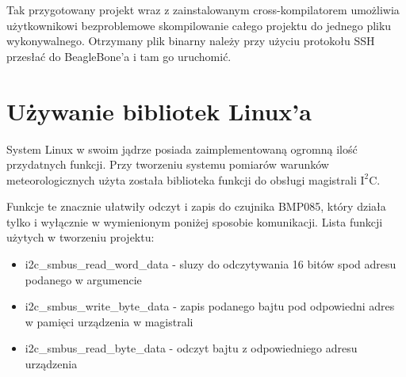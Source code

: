 Tak przygotowany projekt wraz z zainstalowanym cross-kompilatorem umożliwia użytkownikowi bezproblemowe skompilowanie całego projektu do jednego pliku wykonywalnego. Otrzymany plik binarny należy przy użyciu protokołu SSH przesłać do BeagleBone'a i tam go uruchomić.

\section{Używanie bibliotek Linux'a}
System Linux w swoim jądrze posiada zaimplementowaną ogromną ilość przydatnych funkcji. Przy tworzeniu systemu pomiarów warunków meteorologicznych użyta została biblioteka funkcji do obsługi magistrali  $\mathrm{I^{2}C}$.

Funkcje te znacznie ułatwiły odczyt i zapis do czujnika BMP085, który działa tylko i wyłącznie w wymienionym poniżej sposobie komunikacji. Lista funkcji użytych w tworzeniu projektu:

\begin{itemize}
\setlength{\itemsep}{2pt} 
\setlength{\parskip}{2pt} 
\setlength{\parsep}{2pt}
\item i2c\_smbus\_read\_word\_data - sluzy do odczytywania 16 bitów spod adresu podanego w argumencie
\item i2c\_smbus\_write\_byte\_data - zapis podanego bajtu pod odpowiedni adres w pamięci urządzenia w magistrali
\item i2c\_smbus\_read\_byte\_data - odczyt bajtu z odpowiedniego adresu urządzenia
\end{itemize}